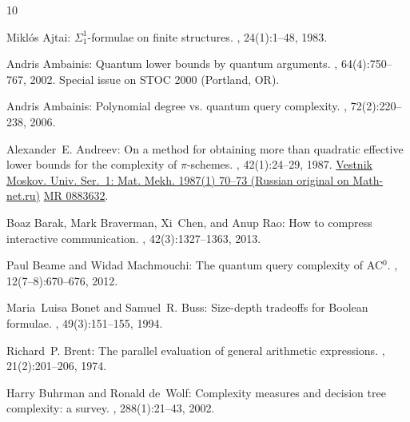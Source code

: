 \documentclass[11pt]{article}
\numberwithin{equation}{section}
\theoremstyle{definition}
\theoremstyle{plain}
\theoremstyle{definition}\newtheorem{notation}[theorem]{Notation}\theoremstyle{plain}
\begin{document}
\tocrefpdfbookmark
\begin{thebibliography}{10}

{\sc Mikl\'{o}s Ajtai}: {$\Sigma_1^1$}-formulae on finite structures.
, 24(1):1--48, 1983.
\newblock [\epfmtdoi{10.1016/0168-0072(83)90038-6}]

{\sc Andris Ambainis}: Quantum lower bounds by quantum arguments.
, 64(4):750--767, 2002.
\newblock Special issue on STOC 2000 (Portland, OR).

{\sc Andris Ambainis}: Polynomial degree vs. quantum query complexity.
, 72(2):220--238, 2006.

{\sc Alexander~E. Andreev}: On a method for obtaining more than quadratic
  effective lower bounds for the complexity of $\pi$-schemes.
, 42(1):24--29, 1987.
\newblock \href{https://mi.mathnet.ru/vmumm3034}{Vestnik Moskov. Univ. Ser.~1:
  Mat. Mekh. 1987(1) 70--73 (Russian original on Math-net.ru)}
  \href{https://mathscinet.ams.org/mathscinet/article?mr=0883632}{MR 0883632}.

{\sc Boaz Barak, Mark Braverman, Xi~Chen, and Anup Rao}: How to compress
  interactive communication.
, 42(3):1327--1363, 2013.
\newblock [\epfmtdoi{10.1137/100811969}]

{\sc Paul Beame and Widad Machmouchi}: The quantum query complexity of
  {AC}\({}^{\mbox{0}}\).
, 12(7--8):670--676, 2012.

{\sc Maria~Luisa Bonet and Samuel~R. Buss}: Size-depth tradeoffs for {B}oolean
  formulae.
, 49(3):151--155, 1994.
\newblock [\epfmtdoi{10.1016/0020-0190(94)90093-0}]

{\sc Richard~P. Brent}: The parallel evaluation of general arithmetic
  expressions.
, 21(2):201--206, 1974.
\newblock [\epfmtdoi{10.1145/321812.321815}]

{\sc Harry Buhrman and Ronald de~Wolf}: Complexity measures and decision tree
  complexity: a survey.
, 288(1):21--43, 2002.
\newblock [\epfmtdoi{10.1016/S0304-3975(01)00144-X}]


\end{thebibliography}
\end{document}
